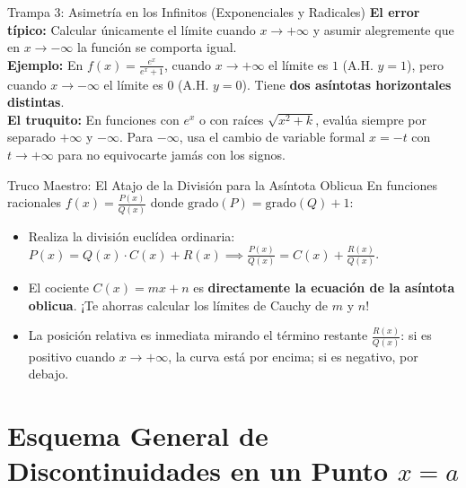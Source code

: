 \documentclass[10pt,a4paper]{article}
\begin{document}
\vspace{3mm}

\begin{trampa}{Trampa 3: Asimetría en los Infinitos (Exponenciales y Radicales)}
\textbf{El error típico:} Calcular únicamente el límite cuando $x \to +\infty$ y asumir alegremente que en $x \to -\infty$ la función se comporta igual.\\
\textbf{Ejemplo:} En $f(x) = \frac{e^x}{e^x + 1}$, cuando $x \to +\infty$ el límite es $1$ (A.H. $y=1$), pero cuando $x \to -\infty$ el límite es $0$ (A.H. $y=0$). Tiene \textbf{dos asíntotas horizontales distintas}.\\
\textbf{El truquito:} En funciones con $e^x$ o con raíces $\sqrt{x^2+k}$, evalúa siempre por separado $+\infty$ y $-\infty$. Para $-\infty$, usa el cambio de variable formal $x = -t$ con $t \to +\infty$ para no equivocarte jamás con los signos.
\end{trampa}

\vspace{3mm}

\begin{trucobox}{Truco Maestro: El Atajo de la División para la Asíntota Oblicua}
En funciones racionales $f(x) = \frac{P(x)}{Q(x)}$ donde $\text{grado}(P) = \text{grado}(Q) + 1$:
\begin{itemize}\itemsep 1.5pt
    \item Realiza la división euclídea ordinaria: $P(x) = Q(x) \cdot C(x) + R(x) \implies \frac{P(x)}{Q(x)} = C(x) + \frac{R(x)}{Q(x)}$.
    \item El cociente $C(x) = mx + n$ es \textbf{directamente la ecuación de la asíntota oblicua}. ¡Te ahorras calcular los límites de Cauchy de $m$ y $n$!
    \item La posición relativa es inmediata mirando el término restante $\frac{R(x)}{Q(x)}$: si es positivo cuando $x \to +\infty$, la curva está por encima; si es negativo, por debajo.
\end{itemize}
\end{trucobox}

\newpage

\section{Esquema General de Discontinuidades en un Punto $x = a$}
\end{document}
